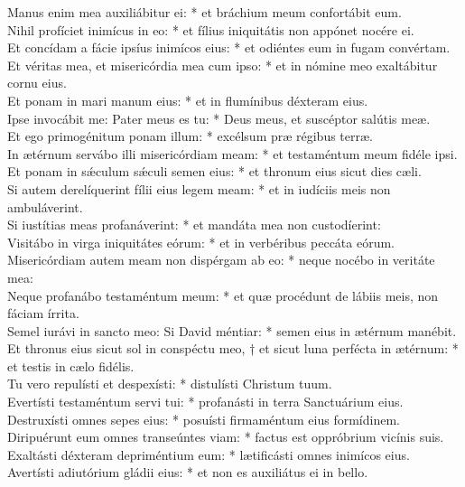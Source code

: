 {	Manus enim mea auxiliábitur ei: * et bráchium meum confortábit eum. \\
	Nihil profíciet inimícus in eo: * et fílius iniquitátis non appónet nocére ei. \\
	Et concídam a fácie ipsíus inimícos eius: * et odiéntes eum in fugam convértam. \\
	Et véritas mea, et misericórdia mea cum ipso: * et in nómine meo exaltábitur cornu eius. \\
	Et ponam in mari manum eius: * et in flumínibus déxteram eius. \\
	Ipse invocábit me: Pater meus es tu: * Deus meus, et suscéptor salútis meæ. \\
	Et ego primogénitum ponam illum: * excélsum præ régibus terræ. \\
	In ætérnum servábo illi misericórdiam meam: * et testaméntum meum fidéle ipsi. \\
	Et ponam in sǽculum sǽculi semen eius: * et thronum eius sicut dies cæli. \\
	Si autem derelíquerint fílii eius legem meam: * et in iudíciis meis non ambuláverint. \\
	Si iustítias meas profanáverint: * et mandáta mea non custodíerint: \\
	Visitábo in virga iniquitátes eórum: * et in verbéribus peccáta eórum. \\
	Misericórdiam autem meam non dispérgam ab eo: * neque nocébo in veritáte mea: \\
	Neque profanábo testaméntum meum: * et quæ procédunt de lábiis meis, non fáciam írrita. \\
	Semel iurávi in sancto meo: Si David méntiar: * semen eius in ætérnum manébit. \\
	Et thronus eius sicut sol in conspéctu meo, † et sicut luna perfécta in ætérnum: * et testis in cælo fidélis. \\
	Tu vero repulísti et despexísti: * distulísti Christum tuum. \\
	Evertísti testaméntum servi tui: * profanásti in terra Sanctuárium eius. \\
	Destruxísti omnes sepes eius: * posuísti firmaméntum eius formídinem. \\
	Diripuérunt eum omnes transeúntes viam: * factus est oppróbrium vicínis suis. \\
	Exaltásti déxteram depriméntium eum: * lætificásti omnes inimícos eius. \\
	Avertísti adiutórium gládii eius: * et non es auxiliátus ei in bello. \\
}
